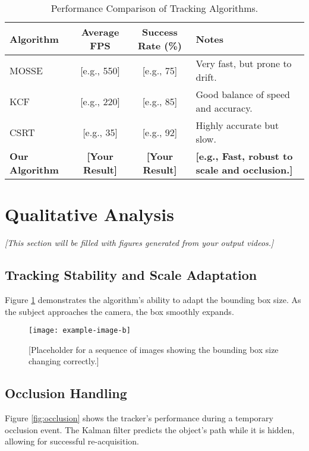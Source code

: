 \documentclass[12pt, a4paper]{report}
\begin{document}
\begin{table}[H]
    \centering
    \caption{Performance Comparison of Tracking Algorithms.\label{tab:comparison}}
    \begin{tabular}{|l|c|c|p{5cm}|}
        \hline
        \textbf{Algorithm} & \textbf{Average FPS} & \textbf{Success Rate (\%)} & \textbf{Notes} \\
        \hline
        MOSSE   & [e.g., 550] & [e.g., 75] & Very fast, but prone to drift. \\
        KCF     & [e.g., 220] & [e.g., 85] & Good balance of speed and accuracy. \\
        CSRT    & [e.g., 35]  & [e.g., 92] & Highly accurate but slow. \\
        \hline
        \textbf{Our Algorithm} & \textbf{[Your Result]} & \textbf{[Your Result]} & \textbf{[e.g., Fast, robust to scale and occlusion.]} \\
        \hline
    \end{tabular}
\end{table}

\section{Qualitative Analysis}
\textit{[This section will be filled with figures generated from your output videos.]}

\subsection{Tracking Stability and Scale Adaptation}
Figure \ref{fig:scale} demonstrates the algorithm's ability to adapt the bounding box size. As the subject approaches the camera, the box smoothly expands.

\begin{figure}[H]
    \centering
    \texttt{[image: example-image-b]}
    \caption{[Placeholder for a sequence of images showing the bounding box size changing correctly.]}
    \label{fig:scale}
\end{figure}

\subsection{Occlusion Handling}
Figure \ref{fig:occlusion} shows the tracker's performance during a temporary occlusion event. The Kalman filter predicts the object's path while it is hidden, allowing for successful re-acquisition.
\end{document}
